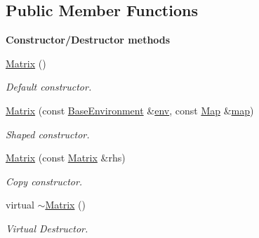 \subsection*{Public Member Functions}
\begin{Indent}{\bf Constructor/\-Destructor methods}\par
\begin{DoxyCompactItemize}
\item 
\hyperlink{class_q_u_e_s_o_1_1_matrix_a2e0493d6ef72c190a7026e1a505488a6}{Matrix} ()
\begin{DoxyCompactList}\small\item\em Default constructor. \end{DoxyCompactList}\item 
\hyperlink{class_q_u_e_s_o_1_1_matrix_a324053bbe984f4549f7b31f0d1aae8b1}{Matrix} (const \hyperlink{class_q_u_e_s_o_1_1_base_environment}{Base\-Environment} \&\hyperlink{class_q_u_e_s_o_1_1_matrix_a1eefeca9f35200e8275fb0fdfa0c8684}{env}, const \hyperlink{class_q_u_e_s_o_1_1_map}{Map} \&\hyperlink{class_q_u_e_s_o_1_1_matrix_ae01c72255466cd95201bb4c7f07e1b83}{map})
\begin{DoxyCompactList}\small\item\em Shaped constructor. \end{DoxyCompactList}\item 
\hyperlink{class_q_u_e_s_o_1_1_matrix_a99e2ce8cfb0db9f98e24a58d78575eb2}{Matrix} (const \hyperlink{class_q_u_e_s_o_1_1_matrix}{Matrix} \&rhs)
\begin{DoxyCompactList}\small\item\em Copy constructor. \end{DoxyCompactList}\item 
virtual \hyperlink{class_q_u_e_s_o_1_1_matrix_a161398a2cf0c9a626651f59f5bd9ae59}{$\sim$\-Matrix} ()
\begin{DoxyCompactList}\small\item\em Virtual Destructor. \end{DoxyCompactList}\end{DoxyCompactItemize}
\end{Indent}
